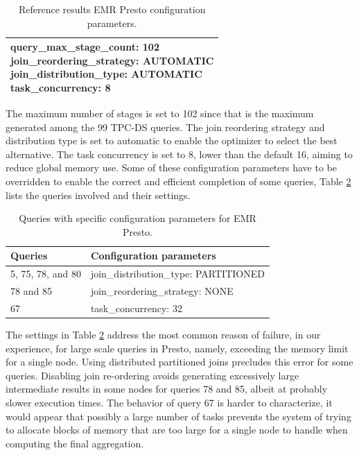 \begin{table}
  \centering
	\begin{tabular}{|l|}
	  \hline
		\makecell[l]{query\_max\_stage\_count: 102 \\
		join\_reordering\_strategy: AUTOMATIC \\
		join\_distribution\_type: AUTOMATIC \\
		task\_concurrency: 8
		}
		\\
		\hline
	\end{tabular}
	\caption{Reference results EMR Presto configuration parameters.}
	\label{table:prestoConfigurationParameters}
\end{table}

The maximum number of stages is set to 102 since that is the maximum generated among the 99 TPC-DS queries. The join reordering strategy and distribution type is set to automatic to enable the optimizer to select the best alternative. The task concurrency is set to 8, lower than the default 16, aiming to reduce global memory use. Some of these configuration parameters have to be overridden to enable the correct and efficient completion of some queries, Table \ref{table:prestoQueryConfigurationParameters} lists the queries involved and their settings.

\begin{table}
  \centering
	\begin{tabular}{|l|l|}
	  \hline
		\textbf{Queries} & \textbf{Configuration parameters} \\ \hline
		5, 75, 78, and 80 & join\_distribution\_type: PARTITIONED \\ \hline
		78 and 85 & join\_reordering\_strategy: NONE \\ \hline
		67 & task\_concurrency: 32
		\\
		\hline
	\end{tabular}
	\caption{Queries with specific configuration parameters for EMR Presto.}
	\label{table:prestoQueryConfigurationParameters}
\end{table}

The settings in Table \ref{table:prestoQueryConfigurationParameters} address the most common reason of failure, in our experience, for large scale queries in Presto, namely, exceeding the memory limit for a single node. Using distributed partitioned joins precludes this error for some queries. Disabling join re-ordering avoids generating excessively large intermediate results in some nodes for queries 78 and 85, albeit at probably slower execution times. The behavior of query 67 is harder to characterize, it would appear that possibly a large number of tasks prevents the system of trying to allocate blocks of memory that are too large for a single node to handle when computing the final aggregation.

